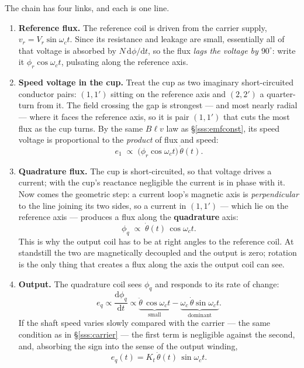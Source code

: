 \documentclass[11pt,a4paper]{article}
\begin{document}
The chain has four links, and each is one line.

\begin{enumerate}[leftmargin=2em,itemsep=3pt]
\item \textbf{Reference flux.} The reference coil is driven from the carrier
      supply, $v_{r}=V_{r}\sin\omega_{c}t$. Since its resistance and leakage
      are small, essentially all of that voltage is absorbed by
      $N\,\mathrm{d}\phi/\mathrm{d}t$, so the flux \emph{lags the voltage by
      $90^\circ$}: write it $\phi_{r}\cos\omega_{c}t$, pulsating along the
      reference axis.
\item \textbf{Speed voltage in the cup.} Treat the cup as two imaginary
      short-circuited conductor pairs: $(1,1')$ sitting on the reference axis
      and $(2,2')$ a quarter-turn from it. The field crossing the gap is
      strongest --- and most nearly radial --- where it faces the reference
      axis, so it is pair $(1,1')$ that cuts the most flux as the cup turns.
      By the same $B\ell v$ law as \S\ref{sss:emfconst}, its speed voltage is
      proportional to the \emph{product} of flux and speed:
      \[
        e_{1}\;\propto\;\big(\phi_{r}\cos\omega_{c}t\big)\,\dot\theta(t).
      \]
\item \textbf{Quadrature flux.} The cup is short-circuited, so that voltage
      drives a current; with the cup's reactance negligible the current is in
      phase with it. Now comes the geometric step: a current loop's magnetic
      axis is \emph{perpendicular} to the line joining its two sides, so a
      current in $(1,1')$ --- which lie on the reference axis --- produces a
      flux along the \textbf{quadrature} axis:
      \[
        \phi_{q}\;\propto\;\dot\theta(t)\,\cos\omega_{c}t .
      \]
      This is why the output coil has to be at right angles to the reference
      coil. At standstill the two are magnetically decoupled and the output is
      zero; rotation is the only thing that creates a flux along the axis the
      output coil can see.
\item \textbf{Output.} The quadrature coil sees $\phi_{q}$ and responds to its
      rate of change:
      \[
        e_{q}\propto\frac{\mathrm{d}\phi_{q}}{\mathrm{d}t}
        \propto\underbrace{\ddot\theta\,\cos\omega_{c}t}_{\text{small}}
              -\underbrace{\omega_{c}\,\dot\theta\sin\omega_{c}t}_{\text{dominant}} .
      \]
      If the shaft speed varies slowly compared with the carrier --- the same
      condition as in \S\ref{sss:carrier} --- the first term is negligible
      against the second, and, absorbing the sign into the sense of the output
      winding,
      \begin{equation}
        e_{q}(t)=K_{t}\,\dot\theta(t)\,\sin\omega_{c}t .
        \label{eq:actacho}
      \end{equation}
\end{enumerate}
\end{document}
